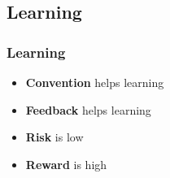 \documentclass{beamer}
\begin{document}
%


\subsection{Learning}

\begin{frame}
	\frametitle{Learning}
	\begin{itemize}
			\item \textbf{Convention} helps learning
			\item \textbf{Feedback} helps learning
			\item \textbf{Risk} is low
			\item \textbf{Reward} is high
		\end{itemize}
\end{frame}

\end{document}
